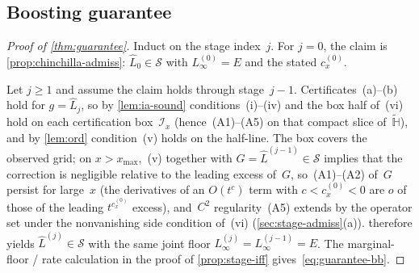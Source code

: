 \documentclass[11pt]{article}
\newcommand{\calS}{\mathcal{S}}
\newcommand{\calI}{\mathcal{I}}
\newcommand{\bbH}{\mathbb{H}}
\newcommand{\Lhat}{\hat{L}}
\theoremstyle{plain}
\theoremstyle{remark}
\begin{document}
\subsection{Boosting guarantee}\label{sec:guarantee-proof}
\begin{proof}[Proof of \cref{thm:guarantee}]
Induct on the stage index~$j$.
For $j=0$, the claim is \cref{prop:chinchilla-admiss}: $\Lhat_0\in\calS$ with $L_\infty^{(0)}=E$ and the stated $c_x^{(0)}$.

Let $j\geq 1$ and assume the claim holds through stage~$j-1$.
Certificates~(a)--(b) hold for $g=\Lhat_j$, so by \cref{lem:ia-sound} conditions~(i)--(iv) and the box half of~(vi) hold on each certification box~$\calI_x$ (hence~(A1)--(A5) on that compact slice of~$\widetilde{\bbH}$), and by \cref{lem:ord} condition~(v) holds on the half-line.
The box covers the observed grid; on $x>x_{\max}$,~(v) together with $G=\Lhat^{(j-1)}\in\calS$ implies that the correction is negligible relative to the leading excess of~$G$, so~(A1)--(A2) of~$G$ persist for large~$x$ (the derivatives of an $O(t^{c})$ term with $c<c_x^{(0)}<0$ are $o$ of those of the leading $t^{c_x^{(0)}}$ excess), and~$C^2$ regularity~(A5) extends by the operator set under the nonvanishing side condition of~(vi) (\cref{sec:stage-admiss}(a)).
 therefore yields $\Lhat^{(j)}\in\calS$ with the same joint floor $L_\infty^{(j)}=L_\infty^{(j-1)}=E$.
The marginal-floor / rate calculation in the proof of \cref{prop:stage-iff} gives~\eqref{eq:guarantee-bb}.
\end{proof}
\end{document}

